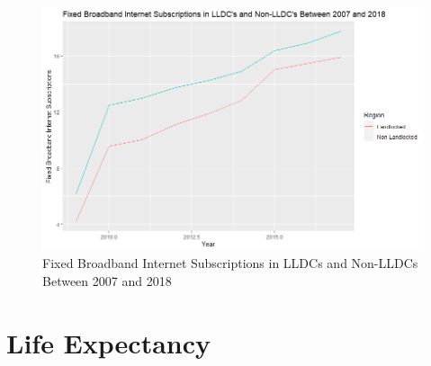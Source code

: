 \documentclass[15pt]{article}
\begin{document}
\begin{figure}[H]
    \centering
    \includegraphics[scale = 0.7]{Part2_Growth.png}
    \caption{Fixed Broadband Internet Subscriptions in LLDCs and Non-LLDCs Between 2007 and 2018}
\end{figure}

\newpage

\section{Life Expectancy}
\end{document}
